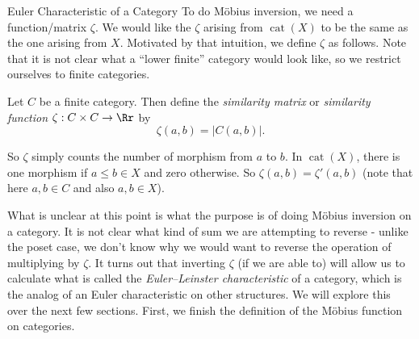 \documentclass[12pt]{pom_thesis}
\DeclareMathOperator{\cat}{cat}
\begin{document}
\begin{chapter}{Euler Characteristic of a Category}
To do M\"obius inversion, we need a function/matrix $\zeta$. We would like the $\zeta$ arising from $\cat(X)$ to be the same as the one arising from $X$. Motivated by that intuition, we define $\zeta$ as follows. Note that it is not clear what a ``lower finite'' category would look like, so we restrict ourselves to finite categories.

\begin{defn}
Let $C$ be a finite category. Then define the \emph{similarity matrix} or \emph{similarity function} $\zeta : C \times C \rightarrow \Rr$ by 
\[
\zeta(a,b) = |C(a,b)|.
\]
\end{defn}
So $\zeta$ simply counts the number of morphism from $a$ to $b$. In $\cat(X)$, there is one morphism if $a \leq b \in X$ and zero otherwise. So $\zeta(a,b) = \zeta'(a,b)$ (note that here $a,b \in C$ and also $a,b \in X$).

What is unclear at this point is what the purpose is of doing M\"obius inversion on a category. It is not clear what kind of sum we are attempting to reverse - unlike the poset case, we don't know why we would want to reverse the operation of multiplying by $\zeta$. It turns out that inverting $\zeta$ (if we are able to) will allow us to calculate what is called the \emph{Euler--Leinster characteristic} of a category, which is the analog of an Euler characteristic on other structures. We will explore this over the next few sections. First, we finish the definition of the M\"obius function on categories.


\end{chapter}
\end{document}
